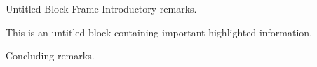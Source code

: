 \documentclass[14pt,t]{beamer}
\begin{document}
\begin{frame}{Untitled Block Frame}
Introductory remarks.

\begin{block}{}
This is an untitled block containing important highlighted information.
\end{block}

Concluding remarks.
\end{frame}
\end{document}
